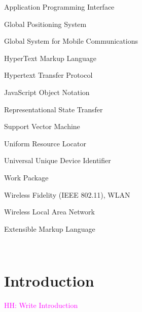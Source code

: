 \documentclass[external]{20120615_deliverable_template_ukob}
\theoremstyle{definition}
\newcommand{\todo}[2]{\textcolor{magenta}{#1: #2}}
\begin{document}
\begin{LGAbbreviations}

{Application Programming Interface}

{Global Positioning System}

{Global System for Mobile Communications}

{HyperText Markup Language}

{Hypertext Transfer Protocol}

{JavaScript Object Notation}

{Representational State Transfer}

{Support Vector Machine}

{Uniform Resource Locator}

{Universal Unique Device Identifier}

{Work Package}

{Wireless Fidelity (IEEE 802.11), WLAN}

{Wireless Local Area Network}

{Extensible Markup Language}

\LGaddabbreviation{~\\}
{~~~}

\end{LGAbbreviations}


\setcounter{tocdepth}{1}

\LGTOC

\newpage

\chapter{Introduction}
\label{chap:Introduction}
\todo{HH}{Write Introduction}
\end{document}
